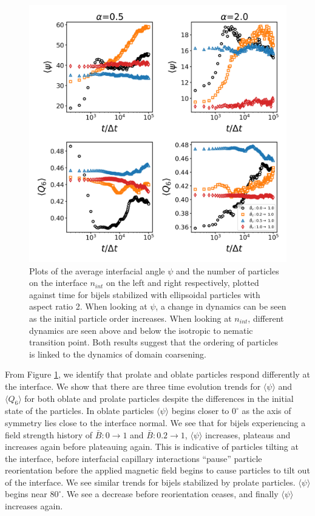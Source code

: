 \begin{figure} 
\centering 
\includegraphics[scale=0.4]{../figures/results/paper2/interface_angle-nint-field_up.png} 
\caption{Plots of the average interfacial angle $\psi$ and the number of particles on the interface $n_{int}$ on the left and right respectively, plotted against time for bijels stabilized with ellipsoidal particles with aspect ratio 2. When looking at $\psi$, a change in dynamics can be seen as the initial particle order increases. When looking at $n_{int}$, different dynamics are seen above and below the isotropic to nematic transition point. Both results suggest that the ordering of particles is linked to the dynamics of domain coarsening.} 
\label{fig:interface_angle-nint-field_up} 
\end{figure}

From Figure \ref{fig:interface_angle-nint-field_up}, we identify that
prolate and oblate particles respond differently at the interface. We
show that there are three time evolution trends for
\(\langle \psi \rangle\) and \(\langle Q_6 \rangle\) for both oblate and
prolate particles despite the differences in the initial state of the
particles. In oblate particles \(\langle \psi \rangle\) begins closer to
\(0 ^{\circ}\) as the axis of symmetry lies close to the interface
normal. We see that for bijels experiencing a field strength history of
\(\bar{B}: 0 \rightarrow 1\) and \(\bar{B}: 0.2 \rightarrow 1\),
\(\langle \psi \rangle\) increases, plateaus and increases again before
plateauing again. This is indicative of particles tilting at the
interface, before interfacial capillary interactions ``pause'' particle
reorientation before the applied magnetic field begins to cause
particles to tilt out of the interface. We see similar trends for bijels
stabilized by prolate particles. \(\langle \psi \rangle\) begins near
\(80 ^{\circ}\). We see a decrease before reorientation ceases, and
finally \(\langle \psi \rangle\) increases again.

